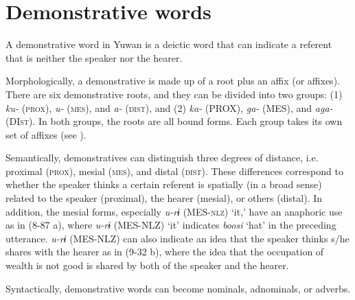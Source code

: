 \section{Demonstrative words}

A demonstrative word in Yuwan is a deictic word that can indicate a referent that is neither the speaker nor the hearer.

  Morphologically, a demonstrative is made up of a root plus an affix (or affixes). There are six demonstrative roots, and they can be divided into two groups: (1) \textit{ku-} (\textsc{prox}), \textit{u-} (\textsc{mes}), and \textit{a-} (\textsc{dist}), and (2) \textit{ka-} (PROX), \textit{ga-} (MES), and \textit{aga-} (DI\textsc{st}). In both groups, the roots are all bound forms. Each group takes its own set of affixes (see ).

  Semantically, demonstratives can distinguish three degrees of distance, i.e. proximal (\textsc{prox}), mesial (\textsc{mes}), and distal (\textsc{dist}). These differences correspond to whether the speaker thinks a certain referent is spatially (in a broad sense) related to the speaker (proximal), the hearer (mesial), or others (distal). In addition, the mesial forms, especially \textit{u-rɨ} (MES-\textsc{nlz}) ‘it,’ have an anaphoric use as in (8-87 a), where \textit{u-rɨ} (MES-NLZ) ‘it’ indicates \textit{boosi} ‘hat’ in the preceding utterance. \textit{u-rɨ} (MES-NLZ) can also indicate an idea that the speaker thinks s/he shares with the hearer as in (9-32 b), where the idea that the occupation of wealth is not good is shared by both of the speaker and the hearer.

Syntactically, demonstrative words can become nominals, adnominals, or adverbs.

